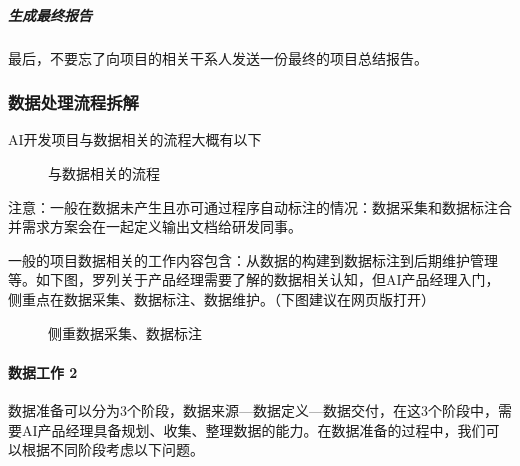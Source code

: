 \documentclass[letterpaper,10pt,english]{sphinxmanual}
\begin{document}
\subparagraph{生成最终报告}
\label{\detokenize{chapter_project/process:id34}}
最后，不要忘了向项目的相关干系人发送一份最终的项目总结报告。


\subsubsection{数据处理流程拆解}
\label{\detokenize{chapter_project/Data Process:id1}}\label{\detokenize{chapter_project/Data Process::doc}}
AI开发项目与数据相关的流程大概有以下

\begin{figure}[H]
\centering
\capstart

\noindent{}
\caption{与数据相关的流程}\label{\detokenize{chapter_project/Data Process:id8}}\end{figure}

注意：一般在数据未产生且亦可通过程序自动标注的情况：数据采集和数据标注合并需求方案会在一起定义输出文档给研发同事。%
\begin{footnote}[804]\sphinxAtStartFootnote
{}
%
\end{footnote}

一般的项目数据相关的工作内容包含：从数据的构建到数据标注到后期维护管理等。如下图，罗列关于产品经理需要了解的数据相关认知，但AI产品经理入门，侧重点在数据采集、数据标注、数据维护。（下图建议在网页版打开）

\begin{figure}[H]
\centering
\capstart

\noindent{}
\caption{侧重数据采集、数据标注}\label{\detokenize{chapter_project/Data Process:id9}}\end{figure}


\paragraph{数据工作 2\sphinxfootnotemark[805]}
\label{\detokenize{chapter_project/Data Process:id2}}%
\begin{footnotetext}[805]\sphinxAtStartFootnote
{}
%
\end{footnotetext}\ignorespaces 
数据准备可以分为3个阶段，数据来源—数据定义—数据交付，在这3个阶段中，需要AI产品经理具备规划、收集、整理数据的能力。在数据准备的过程中，我们可以根据不同阶段考虑以下问题。
\end{document}
